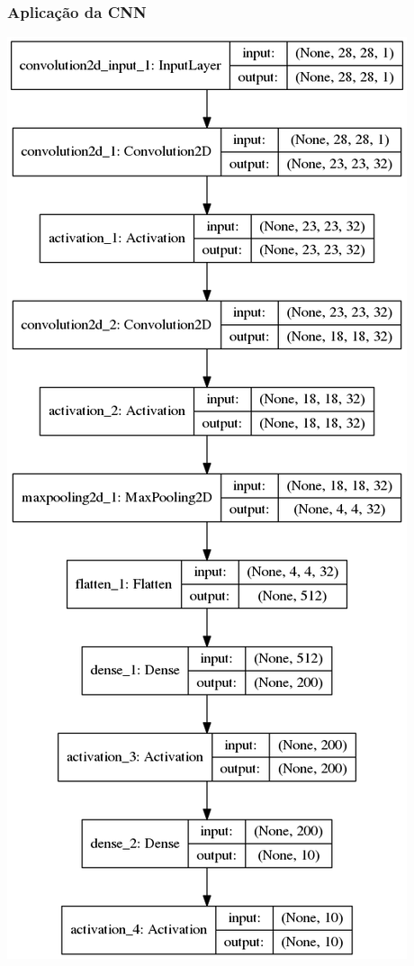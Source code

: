 \documentclass[tikz,11pt]{beamer}
\begin{document}
\begin{frame}
	\frametitle{Aplicação da CNN}
	\centering
	\includegraphics[height=.8\paperheight]{images/resultados/default/model}
\end{frame}
\end{document}
